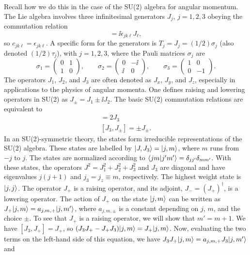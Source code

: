 Recall how we do this in the case of the SU(2) algebra for angular momentum. The Lie algebra involves three
infinitesimal generators $J_j$, $j = 1,2,3$ obeying the commutation relation
\begin{equation}
  [J_j,J_k] = \ii\epsilon_{jk\ell}J_\ell ,
\end{equation}
so $c_{jk\ell} = \epsilon_{jk\ell}$. A specific form for the generators is $T_j = J_j = (1/2)\sigma_j$ (also denoted
$(1/2)\tau_j$), with $j = 1,2,3$, where the Pauli matrices $\sigma_j$ are
\begin{equation}
  \sigma_1 = \begin{pmatrix} 0 & 1\\ 1 & 0\end{pmatrix}, \qquad
  \sigma_2 = \begin{pmatrix} 0 & -\ii\\ \ii & 0\end{pmatrix}, \qquad
  \sigma_3 = \begin{pmatrix} 1 & 0\\ 0 & -1\end{pmatrix} .
\end{equation}
The operators $J_1$, $J_2$, and $J_3$ are often denoted as $J_x$, $J_y$, and $J_z$, especially in applications to the
physics of angular momenta. One defines raising and lowering operators in SU(2) as $J_\pm = J_1\pm\ii J_2$. The basic
SU(2) commutation relations are equivalent to
\begin{gather}
  [J_+,J_-] = 2J_3 \\
  [J_3,J_\pm] = \pm J_\pm .
\end{gather}
In an SU(2)-symmetric theory, the states form irreducible representations of the SU(2) algebra. These states are
labelled by $\lvert J,J_3\rangle = \lvert j,m\rangle$, where $m$ runs from $-j$ to $j$. The states are normalized according to
$\langle jm\vert j'm'\rangle = \delta_{jj'}\delta_{mm'}$. With these states, the operators $J^2 = J_1^2+J_2^2+J_3^2$ and $J_3$
are diagonal and have eigenvalues $j(j+1)$ and $j_3 = j_z\equiv m$, respectively. The highest weight state is
$\lvert j,j\rangle$. The operator $J_+$ is a raising operator, and its adjoint, $J_- = (J_+)^\dagger$, is a lowering operator.
The action of $J_+$ on the state $\lvert j,m\rangle$ can be written as $J_+\lvert j,m\rangle = a_{j,m,+}\lvert j,m'\rangle$, where
$a_{j,m,\pm}$ is a constant depending on $j$, $m$, and the choice $\pm$. To see that $J_+$ is a raising operator, we
will show that $m' = m+1$. We have $[J_3,J_+] = J_+$, so $(J_3J_+-J_+J_3)\lvert j,m\rangle = J_+\lvert j,m\rangle$. Now, evaluating the
two terms on the left-hand side of this equation, we have $J_3J_+\lvert j,m\rangle = a_{j,m,+}J_3\lvert j,m'\rangle$ and
